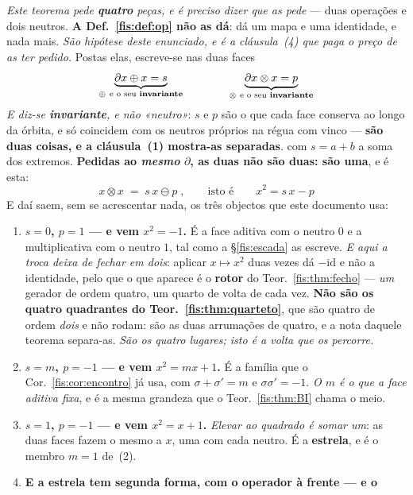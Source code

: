 \documentclass[livro.tex]{subfiles}
\begin{document}
\begin{teorema}\label{fis:thm:duasfaces}
\emph{Este teorema pede \textbf{quatro} peças, e é preciso dizer que as pede} ---
duas operações e dois neutros. \textbf{A Def.~\ref{fis:def:op} não as dá}: dá um
mapa e uma identidade, e nada mais. \emph{São hipótese deste enunciado, e é a
cláusula~(4) que paga o preço de as ter pedido.} Postas elas, escreve-se nas duas faces
\[
\underbrace{\partial x\oplus x=s}_{\oplus\ \text{e o seu \textbf{invariante}}}
\qquad\qquad
\underbrace{\partial x\otimes x=p}_{\otimes\ \text{e o seu \textbf{invariante}}}
\]
\emph{E diz-se \textbf{invariante}, e não «neutro»}: $s$ e $p$ são o que cada face
conserva ao longo da órbita, e só coincidem com os neutros próprios na régua com
vinco --- \textbf{são duas coisas, e a cláusula~(1) mostra-as separadas}.
com $s=a+b$ a soma dos extremos. \textbf{Pedidas ao \emph{mesmo} $\partial$, as
duas não são duas: são uma}, e é esta:
\[
\boxed{\;x\otimes x\;=\;s\,x\ominus p\;,\qquad\text{isto é}\qquad x^{2}=s\,x-p\;}
\]
E daí saem, sem se acrescentar nada, os três objectos que este documento usa:
\begin{enumerate}\itemsep3pt
\item[(1)] \textbf{$s=0$, $p=1$ --- e vem $x^{2}=-1$.} É a face aditiva com o
neutro $0$ e a multiplicativa com o neutro $1$, tal como a §\ref{fis:escada} as
escreve. \emph{E aqui a troca deixa de fechar em dois}: aplicar $x\mapsto x^{2}$
duas vezes dá $-\mathrm{id}$ e não a identidade, pelo que o que aparece é o
\textbf{rotor} do Teor.~\ref{fis:thm:fecho} --- \emph{um} gerador de ordem
quatro, um quarto de volta de cada vez. \textbf{Não são os quatro quadrantes do
Teor.~\ref{fis:thm:quarteto}}, que são quatro de ordem \emph{dois} e não rodam:
são as duas arrumações de quatro, e a nota daquele teorema separa-as. \emph{São
os quatro lugares; isto é a volta que os percorre.}
\item[(2)] \textbf{$s=m$, $p=-1$ --- e vem $x^{2}=mx+1$.} É a família que o
Cor.~\ref{fis:cor:encontro} já usa, com $\sigma+\sigma'=m$ e
$\sigma\sigma'=-1$. \emph{O $m$ é o que a face aditiva fixa}, e é a mesma
grandeza que o Teor.~\ref{fis:thm:BI} chama o meio.
\item[(3)] \textbf{$s=1$, $p=-1$ --- e vem $x^{2}=x+1$.} \emph{Elevar ao quadrado
é somar um}: as duas faces fazem o mesmo a $x$, uma com cada neutro. É a
\textbf{estrela}, e é o membro $m=1$ de~(2).
\item[(4)] \textbf{E a estrela tem segunda forma, com o operador à frente --- e o
}
\end{enumerate}
\end{teorema}
\end{document}
